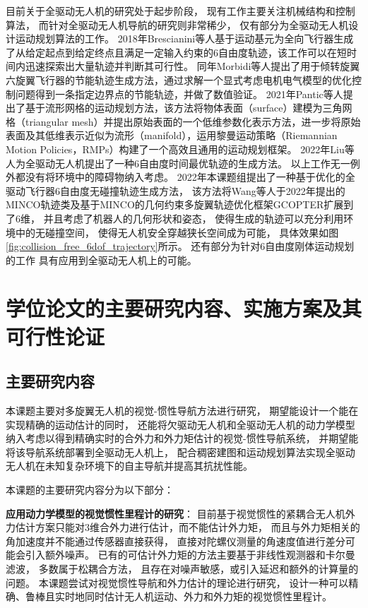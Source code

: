 目前关于全驱动无人机的研究处于起步阶段，
现有工作主要关注机械结构和控制算法，
而针对全驱动无人机导航的研究则非常稀少，
仅有部分为全驱动无人机设计运动规划算法的工作。
2018年Brescianini等人基于运动基元为全向飞行器生成了从给定起点到给定终点且满足一定输入约束的6自由度轨迹\cite{brescianini2018computationally}，该工作可以在短时间内迅速探索出大量轨迹并判断其可行性。
同年Morbidi等人提出了用于倾转旋翼六旋翼飞行器的节能轨迹生成方法\cite{morbidi2018energy}，通过求解一个显式考虑电机电气模型的优化控制问题得到一条指定边界点的节能轨迹，并做了数值验证。
2021年Pantic等人提出了基于流形网格的运动规划方法\cite{pantic2021mesh}，该方法将物体表面（surface）建模为三角网格（triangular mesh）并提出原始表面的一个低维参数化表示方法，进一步将原始表面及其低维表示近似为流形（manifold），运用黎曼运动策略（Riemannian Motion Policies，RMPs）构建了一个高效且通用的运动规划框架。
2022年Liu等人为全驱动无人机提出了一种6自由度时间最优轨迹的生成方法\cite{liu2022optimal}。
以上工作无一例外都没有将环境中的障碍物纳入考虑。
2022年本课题组提出了一种基于优化的全驱动飞行器6自由度无碰撞轨迹生成方法\cite{liu2022collision}，
该方法将Wang等人于2022年提出的MINCO轨迹类及基于MINCO的几何约束多旋翼轨迹优化框架GCOPTER\cite{wang2022geometrically}扩展到了6维，
并且考虑了机器人的几何形状和姿态，
使得生成的轨迹可以充分利用环境中的无碰撞空间，
使得无人机安全穿越狭长空间成为可能，
具体效果如图\ref{fig:collision_free_6dof_trajectory}所示。
还有部分为针对6自由度刚体运动规划的工作
\cite{nguyen2016time, belta2002svd, belta2002euclidean, bestaoui2003motion, zefran1998generation, watterson2016smooth, jackson2021planning}
具有应用到全驱动无人机上的可能。

\section{学位论文的主要研究内容、实施方案及其可行性论证}
\subsection{主要研究内容}
本课题主要对多旋翼无人机的视觉-惯性导航方法进行研究，
期望能设计一个能在实现精确的运动估计的同时，
还能将欠驱动无人机和全驱动无人机的动力学模型纳入考虑以得到精确实时的合外力和外力矩估计的视觉-惯性导航系统，
并期望能将该导航系统部署到全驱动无人机上，
配合稠密建图和运动规划算法实现全驱动无人机在未知复杂环境下的自主导航并提高其抗扰性能。

本课题的主要研究内容分为以下部分：

\textbf{应用动力学模型的视觉惯性里程计的研究}：
目前基于视觉惯性的紧耦合无人机外力估计方案只能对3维合外力进行估计，而不能估计外力矩，
而且与外力矩相关的角加速度并不能通过传感器直接获得，
直接对陀螺仪测量的角速度值进行差分可能会引入额外噪声\cite{邱国鹏2023应用视觉}。
已有的可估计外力矩的方法主要基于非线性观测器和卡尔曼滤波，
多数属于松耦合方法，
且存在对噪声敏感，或引入延迟和额外的计算量的问题。
本课题尝试对视觉惯性导航和外力估计的理论进行研究，
设计一种可以精确、鲁棒且实时地同时估计无人机运动、外力和外力矩的视觉惯性里程计。

